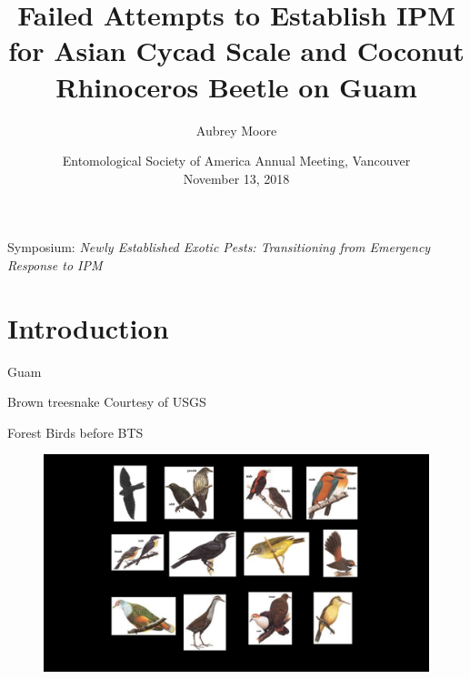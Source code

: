 \documentclass[]{beamer}
\title[IPM Failures on Guam]{Failed Attempts to Establish IPM for Asian Cycad Scale and Coconut Rhinoceros Beetle on Guam}
\author{Aubrey Moore}
\institute[University of Guam]{College of Natural and Applied Sciences\\University of Guam}
\date[]{Entomological Society of America Annual Meeting, Vancouver\\November 13, 2018}
\begin{document}

\begin{frame}
	\scriptsize{Symposium: \textit{Newly Established Exotic Pests: Transitioning from Emergency Response to IPM}}
	\titlepage
\end{frame}


\section{Introduction}

\begin{frame}{Guam}
\end{frame}

\begin{frame}{Brown treesnake}
	\tiny{Courtesy of USGS}
\end{frame}

\begin{frame}{Forest Birds before BTS}
	\begin{figure}
		\includegraphics[height=0.8\textheight]{birds-before-bts.png}
	\end{figure}
\end{frame}
\end{document}
